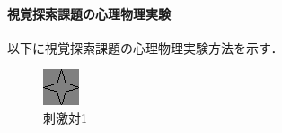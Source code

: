 \paragraph{視覚探索課題の心理物理実験}
以下に視覚探索課題の心理物理実験方法を示す．

\begin{figure}
    \vspace{-1cm}
    \centering
    \caption{刺激対1}
    \label{fig:刺激対1}
    \begin{minipage}[t]{.13\textwidth}
        \centering
        \includegraphics[keepaspectratio,width=\textwidth]{../../13_BehavioralExperiment/syuri.png}
    \end{minipage}
    \begin{minipage}[t]{.13\textwidth}
        \centering

\end{minipage}
\end{figure}
